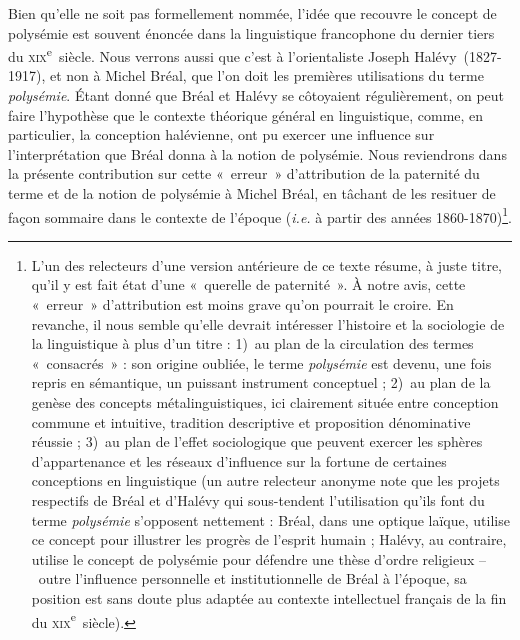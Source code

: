 \documentclass[output=paper]{langsci/langscibook}
\begin{document}
 Bien qu’elle ne soit pas formellement nommée, l’idée que recouvre le concept de polysémie est souvent énoncée dans la linguistique francophone du dernier tiers du \textsc{xix}\textsuperscript{e}~siècle. Nous verrons aussi que c’est à l’orientaliste Joseph Halévy~(1827-1917), et non à Michel Bréal, que l’on doit les premières utilisations du terme \textit{polysémie}. Étant donné que Bréal et Halévy se côtoyaient régulièrement, on peut faire l’hypothèse que le contexte théorique général en linguistique, comme, en particulier, la conception halévienne, ont pu exercer une influence sur l’interprétation que Bréal donna à la notion de polysémie. Nous reviendrons dans la présente contribution sur cette «~erreur~» d’attribution de la paternité du terme et de la notion de polysémie à Michel Bréal, en tâchant de les resituer de façon sommaire dans le contexte de l’époque (\textit{i.e.} à partir des années 1860-1870)\footnote{\textstyleFootnoteSymbol{ }\textrm{L’un des relecteurs d’une version antérieure de ce texte résume, à juste titre, qu’il y est fait état d’une «~querelle de paternité~». À notre avis, cette «~erreur~» d’attribution est moins grave qu’on pourrait le croire. En revanche, il nous semble qu’elle devrait intéresser l’histoire et la sociologie de la linguistique à plus d’un titre : 1)~au plan de la circulation des termes «~consacrés~» : son origine oubliée, le terme} \textrm{\textit{polysémie}} \textrm{est devenu, une fois repris en sémantique, un puissant instrument conceptuel ; 2)~au plan de la genèse des concepts métalinguistiques, ici clairement située entre conception commune et intuitive, tradition descriptive et proposition dénominative réussie ; 3)~au plan de l’effet sociologique que peuvent exercer les sphères d’appartenance et les réseaux d’influence sur la fortune de certaines conceptions en linguistique (un autre relecteur anonyme note que les projets respectifs de Bréal et d’Halévy qui sous-tendent l’utilisation qu’ils font du terme} \textrm{\textit{polysémie}} \textrm{s’opposent nettement : Bréal, dans une optique laïque, utilise ce concept pour illustrer les progrès de l’esprit humain ; Halévy, au contraire, utilise le concept de polysémie pour défendre une thèse d’ordre religieux –~outre l’influence personnelle et institutionnelle de Bréal à l’époque, sa position est sans doute plus adaptée au contexte intellectuel français de la fin du} \textrm{\textsc{xix}}\textrm{\textsuperscript{e}}\textrm{~siècle).}}.
 
\end{document}
